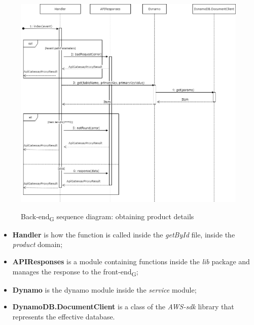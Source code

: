 \begin{figure}[H]
\centering
\includegraphics[scale=0.45]{res/Architettura/Backend/img/diagrammaSequenzaRicezioneProdotto}\\
\caption{Back-end\textsubscript{G} sequence diagram: obtaining product details}
\end{figure}

\begin{itemize}
\item \textbf{Handler} is how the function is called inside the \textit{getById} file, inside the \textit{product} domain;
\item \textbf{APIResponses} is a module containing functions inside the \textit{lib} package and manages the response to the front-end\textsubscript{G};
\item \textbf{Dynamo} is the dynamo module inside the \textit{service} module;
\item \textbf{DynamoDB.DocumentClient} is a class of the \textit{AWS-sdk} library that represents the effective database.

\end{itemize}



